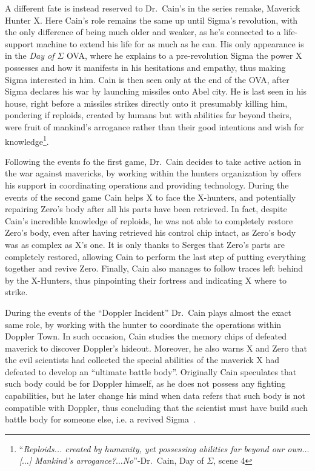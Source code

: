 A different fate is instead reserved to Dr.~Cain's in the series remake, Maverick Hunter X. Here Cain's role remains the same up until Sigma's revolution, with the only difference of being much older and weaker, as he's connected to a life-support machine to extend his life for as much as he can. His only appearance is in the \emph{Day of $\Sigma$} OVA, where he explains to a pre-revolution Sigma the power X possesses and how it manifests in his hesitations and empathy, thus making Sigma interested in him. Cain is then seen only at the end of the OVA, after Sigma declares his war by launching missiles onto Abel city. He is last seen in his house, right before a missiles strikes directly onto it presumably killing him, pondering if reploids, created by humans but with abilities far beyond theirs, were fruit of mankind's arrogance rather than their good intentions and wish for knowledge\footnote{``\textit{Reploids... created by humanity, yet possessing abilities far beyond our own$\dots$ [$\dots$] Mankind's arrogance?$\dots$No}''-Dr.~Cain, Day of $\Sigma$, scene 4}.

Following the events fo the first game, Dr.~Cain decides to take active action in the war against mavericks, by working within the hunters organization by offers his support in coordinating operations and providing technology. During the events of the second game Cain helps X to face the X-hunters, and potentially repairing Zero's body after all his parts have been retrieved. In fact, despite Cain's incredible knowledge of reploids, he was not able to completely restore Zero's body, even after having retrieved his control chip intact, as Zero's body was as complex as X's one. It is only thanks to Serges that Zero's parts are completely restored, allowing Cain to perform the last step of putting everything together and revive Zero. Finally, Cain also manages to follow traces left behind by the X-Hunters, thus pinpointing their fortress and indicating X where to strike. 

During the events of the ``Doppler Incident'' Dr.~Cain plays almost the exact same role, by working with the hunter to coordinate the operations within Doppler Town. In such occasion, Cain studies the memory chips of defeated maverick to discover Doppler's hideout. Moreover, he also warns X and Zero that the evil scientists had collected the special abilities of the maverick X had defeated to develop an ``ultimate battle body''. Originally Cain speculates that such body could be for Doppler himself, as he does not possess any fighting capabilities, but he later change his mind when data refers that such body is not compatible with Doppler, thus concluding that the scientist must have build such battle body for someone else, i.e. a revived Sigma~\cite{wordpress:X3_japanese_script}.

